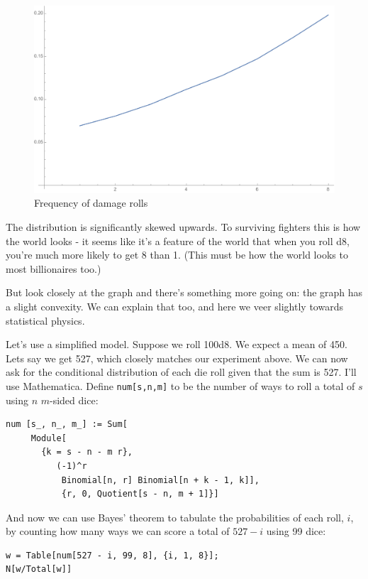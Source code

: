 \documentclass[12pt]{article}
\begin{document}
\begin{figure}
\begin{center}
\includegraphics[scale=0.5]{rolls1.pdf}
\caption{Frequency of damage rolls}
\label{rolls:1}
\end{center}
\end{figure}

The distribution is significantly skewed upwards.
To surviving fighters this is how the world looks - it seems like it's a feature of the world that when you roll d8, you're much more likely to get 8 than 1.
(This must be how the world looks to most billionaires too.)

But look closely at the graph and there's something more going on: the graph has a slight convexity.
We can explain that too, and here we veer slightly towards statistical physics.

Let's use a simplified model. Suppose we roll 100d8. We expect a mean of 450.
Lets say we get 527, which closely matches our experiment above.
We can now ask for the conditional distribution of each die roll given that the sum is 527.
I'll use Mathematica.
Define \verb|num[s,n,m]| to be the number of ways to roll a total of $s$ using $n$ $m$-sided dice:

\begin{verbatim}
num [s_, n_, m_] := Sum[
     Module[
       {k = s - n - m r},
          (-1)^r
           Binomial[n, r] Binomial[n + k - 1, k]],
           {r, 0, Quotient[s - n, m + 1]}]
\end{verbatim}

And now we can use Bayes' theorem to tabulate the probabilities of each roll, $i$, by counting how many ways we can score a total of $527-i$ using 99 dice:

\begin{verbatim}
w = Table[num[527 - i, 99, 8], {i, 1, 8}];
N[w/Total[w]]
\end{verbatim}
\end{document}
